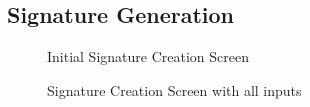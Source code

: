 \documentclass[]{final_report}
\theoremstyle{definition}
\begin{document}
\subsection{Signature Generation}
\begin{figure}[H]
    \centering %
    
    \begin{minipage}{0.49\textwidth}
        \centering
        \caption{Initial Signature Creation Screen}
        \label{fig:image1}
    \end{minipage}
    \hfill %
    \begin{minipage}{0.49\textwidth}
        \centering
        \caption{Signature Creation Screen with all inputs}
        \label{fig:image2}
    \end{minipage}
\end{figure}
\end{document}
